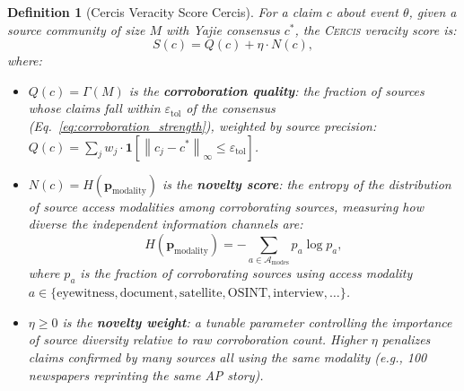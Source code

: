 \documentclass[11pt,a4paper]{article}
\newtheorem{definition}[theorem]{Definition}
\theoremstyle{definition}
\newcommand{\Cercis}{\textsc{Cercis}}
\newcommand{\ind}[1]{\mathbf{1}[#1]}
\newcommand{\norm}[1]{\left\lVert#1\right\rVert}
\begin{document}
\begin{definition}[Cercis Veracity Score Cercis]
\label{def:cercis}
For a claim $c$ about event $\theta$, given a source community of size $M$ with Yajie consensus $c^*$, the \Cercis{} veracity score is:
\begin{equation}
    S(c) = Q(c) + \eta \cdot N(c),
    \label{eq:cercis}
\end{equation}
where:
\begin{itemize}
    \item $Q(c) = \Gamma(M)$ is the \textbf{corroboration quality}: the fraction of sources whose claims fall within $\varepsilon_{\mathrm{tol}}$ of the consensus (Eq.~\eqref{eq:corroboration_strength}), weighted by source precision: $Q(c) = \sum_j w_j \cdot \ind{\norm{c_j - c^*}_\infty \leq \varepsilon_{\mathrm{tol}}}$.
    \item $N(c) = H(\mathbf{p}_{\mathrm{modality}})$ is the \textbf{novelty score}: the entropy of the distribution of source access modalities among corroborating sources, measuring how diverse the independent information channels are:
    \begin{equation}
        H(\mathbf{p}_{\mathrm{modality}}) = -\sum_{a \in \mathcal{A}_{\mathrm{modes}}} p_a \log p_a,
        \label{eq:modality_entropy}
    \end{equation}
    where $p_a$ is the fraction of corroborating sources using access modality $a \in \{\text{eyewitness}, \text{document}, \text{satellite}, \text{OSINT}, \text{interview}, \ldots\}$.
    \item $\eta \geq 0$ is the \textbf{novelty weight}: a tunable parameter controlling the importance of source diversity relative to raw corroboration count. Higher $\eta$ penalizes claims confirmed by many sources all using the same modality (e.g., 100 newspapers reprinting the same AP story).
\end{itemize}
\end{definition}
\end{document}
